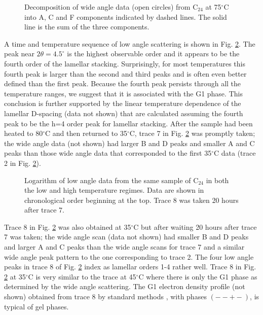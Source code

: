 \begin{figure}[t]
\centerline {}
\caption{Decomposition of wide angle data (open circles) from C$_{24}$
at 75$^{\circ}$C into A, C and F components indicated by dashed lines.
The solid line is the sum of the three components.
\label{anol:fig7}}
\end{figure}

A time and temperature sequence of low angle scattering is shown in 
Fig. \ref{anol:fig8}.
The peak near $2 \theta = 4.5^{\circ}$ is the highest observable order and
it appears to be the fourth order of the lamellar stacking.
Surprisingly, for most temperatures this fourth peak is larger
than the second and third peaks and is often even better defined 
than the first peak.  Because the fourth peak persists through all the
temperature ranges, we suggest that it is associated with the G1 phase.
This conclusion is further supported by the linear temperature dependence
of the lamellar D-spacing (data not shown) that are calculated assuming the
fourth peak to be the h=4 order peak for lamellar stacking.
After the sample had been heated to 80$^{\circ}$C and then returned to 
35$^{\circ}$C,
trace 7 in Fig. \ref{anol:fig8} was promptly taken;
the wide angle data (not shown) had larger B and D peaks and smaller A and C 
peaks than those wide angle data that corresponded to the first 
35$^{\circ}$C data (trace 2 in Fig. \ref{anol:fig8}).

\begin{figure}[t]
\centerline {}
\caption{Logarithm of low angle data from the same sample of C$_{24}$ in both
the low and high temperature regimes.  Data are shown in chronological order
beginning at the top.   Trace 8 was taken 20 hours after trace 7.
\label{anol:fig8}}
\end{figure}

Trace 8 in Fig. \ref{anol:fig8} was also obtained at 35$^{\circ}$C but after 
waiting 20 hours 
after trace 7 was taken; the wide angle scan (data not shown) had smaller B 
and D peaks and larger A and C peaks than the wide angle scans for trace 7 and
a similar wide angle peak pattern to the one corresponding to trace 2.
The four low angle peaks in trace 8 of Fig. \ref{anol:fig8} index as 
lamellar orders 1-4 rather well.  
Trace 8 in Fig. \ref{anol:fig8} at 35$^{\circ}$C is very similar to the 
trace at 45$^{\circ}$C 
where there is only the G1 phase as determined by the wide angle scattering.
The G1 electron density profile (not shown) obtained from trace 8 by standard 
methods \cite{McI89}, with phases $(--+-)$, is typical of gel phases.

